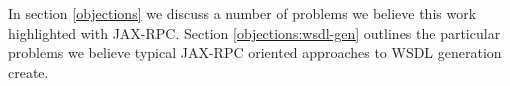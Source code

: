 In section \ref{objections} we discuss a number of problems we believe
this work highlighted with JAX-RPC. Section \ref{objections:wsdl-gen}
outlines the particular problems we believe typical JAX-RPC oriented
approaches to WSDL generation create.








